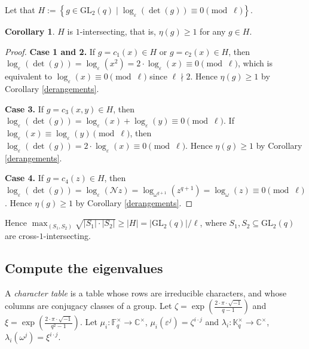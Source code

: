 \documentclass[12pt, reqno]{amsart}
\theoremstyle{definition}
\newtheorem{corollary}[theorem]{Corollary}
\theoremstyle{remark}
\numberwithin{equation}{section}
\newcommand{\BC}{\mathbb{C}}
\newcommand{\BF}{\mathbb{F}}
\newcommand{\BK}{\mathbb{K}}
\newcommand{\CN}{\mathcal{N}}
\newcommand{\gs}{\geqslant}
\newcommand{\pt}[1]{\left(#1\right)}
\newcommand{\cb}[1]{\left\{#1\right\}}
\newcommand{\abs}[1]{\left|#1\right|}
\newcommand{\GL}{\mathrm{GL}}
\begin{document}
Let that $H := \cb{g \in \GL_2(q) \;|\; \log_\varepsilon(\det(g)) \equiv 0 \pmod{\ell}}$.

\begin{corollary}
	
	$H$ is $1$-intersecting, that is, $\eta(g) \gs 1$ for any $g \in H$.
	
\end{corollary}

\begin{proof}
	
	\textbf{Case 1 and 2.} If $g = c_1(x) \in H$ or $g = c_2(x) \in H$, then $\log_\varepsilon(\det(g)) = \log_\varepsilon(x^2) = 2\cdot\log_\varepsilon(x) \equiv 0 \pmod{\ell}$, which is equivalent to $\log_\varepsilon(x) \equiv 0 \pmod{\ell}$ since $\ell \nmid 2$. Hence $\eta(g) \gs 1$ by Corollary \ref{derangements}.
	
	\textbf{Case 3.} If $g = c_3(x, y) \in H$, then $\log_\varepsilon(\det(g)) = \log_\varepsilon(x) + \log_\varepsilon(y) \equiv 0 \pmod{\ell}$. If $\log_\varepsilon(x) \equiv \log_\varepsilon(y) \pmod{\ell}$, then $\log_\varepsilon(\det(g)) = 2 \cdot \log_\varepsilon(x) \equiv 0 \pmod{\ell}$. Hence $\eta(g) \gs 1$ by Corollary \ref{derangements}.
	
	\textbf{Case 4.} If $g = c_4(z) \in H$, then $\log_\varepsilon(\det(g)) = \log_\varepsilon(\CN z) = \log_{\omega^{q + 1}}(z^{q + 1}) = \log_\omega(z) \equiv 0 \pmod{\ell}$. Hence $\eta(g) \gs 1$ by Corollary \ref{derangements}.\qedhere
	
\end{proof}

Hence $\max_{\pt{S_1, S_2}}\sqrt{\abs{S_1}\cdot\abs{S_2}} \gs \abs{H} = \abs{\GL_2(q)}/\ell$, where $S_1, S_2 \subseteq \GL_2(q)$ are cross-$1$-intersecting.

\subsection{Compute the eigenvalues}

A \emph{character table} is a table whose rows are irreducible characters, and whose columns are conjugacy classes of a group. Let $\zeta = \exp\pt{\frac{2\cdot\pi\cdot\sqrt{-1}}{q - 1}}$ and $\xi = \exp\pt{\frac{2\cdot\pi\cdot\sqrt{-1}}{q^2 - 1}}$. Let $\mu_i: \BF_q^\times \rightarrow \BC^\times$, $\mu_i(\varepsilon^j) = \zeta^{i\cdot j}$ and $\lambda_i: \BK_q^\times \rightarrow \BC^\times$, $\lambda_i(\omega^j) = \xi^{i\cdot j}$.
\end{document}
